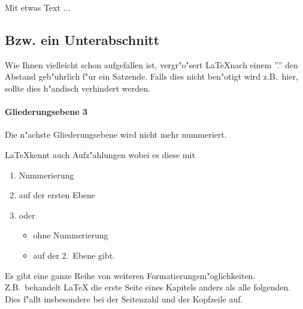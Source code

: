 Mit etwas Text ...

\subsection[Unterabschnitt]{Bzw. ein Unterabschnitt}

Wie Ihnen vielleicht schon aufgefallen ist, vergr"o"sert \LaTeX nach einem ''.'' den Abstand geb"uhrlich f"ur ein Satzende. Falls dies nicht ben"otigt wird z.B.~hier, sollte dies h"andisch verhindert werden.

\paragraph{Gliederungsebene 3} Die n"achste Gliederungsebene wird nicht mehr nummeriert.

\LaTeX kennt auch Aufz"ahlungen wobei es diese mit
\begin{enumerate}
\item Nummerierung
\item\label{enum-ebene} auf der ersten Ebene
\item oder
\begin{itemize}
\item ohne Nummerierung
\item auf der 2.~Ebene gibt.
\end{itemize}
\end{enumerate}
Es gibt eine ganze Reihe von weiteren Formatierungsm"oglichkeiten. Z.B.~behandelt {\LaTeX} die erste Seite eines Kapitels anders als alle folgenden. Dies f"allt insbesondere bei der Seitenzahl und der Kopfzeile auf.
